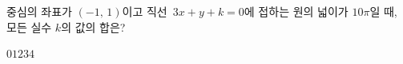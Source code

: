 중심의 좌표가 $(-1,\,1)$이고 직선~$3x+y+k=0$에 접하는 원의 넓이가 $10\pi$일 때, 모든 실수 $k$의 값의 합은?
\begin{choices32}{$0$}{$1$}{$2$}{$3$}{$4$}\end{choices32}
